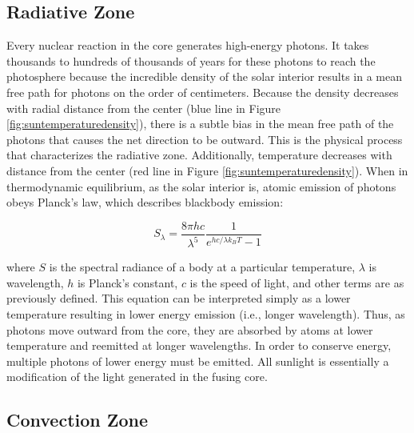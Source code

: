 \subsection{Radiative Zone}
Every nuclear reaction in the core generates high-energy photons. It takes thousands to hundreds of thousands of years for these photons to reach the photosphere because the incredible density of the solar interior results in a mean free path for photons on the order of centimeters. Because the density decreases with radial distance from the center (blue line in Figure \ref{fig:suntemperaturedensity}), there is a subtle bias in the mean free path of the photons that causes the net direction to be outward. This is the physical process that characterizes the radiative zone. Additionally, temperature decreases with distance from the center (red line in Figure \ref{fig:suntemperaturedensity}). When in thermodynamic equilibrium, as the solar interior is, atomic emission of photons obeys Planck's law, which describes blackbody emission: 

\begin{equation}
    \label{eq:planck}
    S_\lambda = \frac{8\pi hc}{\lambda^5}\frac{1}{e^{hc/\lambda k_BT} - 1}
\end{equation}

\noindent where $S$ is the spectral radiance of a body at a particular temperature, $\lambda$ is wavelength, $h$ is Planck's constant, $c$ is the speed of light, and other terms are as previously defined. This equation can be interpreted simply as a lower temperature resulting in lower energy emission (i.e., longer wavelength). Thus, as photons move outward from the core, they are absorbed by atoms at lower temperature and reemitted at longer wavelengths. In order to conserve energy, multiple photons of lower energy must be emitted. All sunlight is essentially a modification of the light generated in the fusing core. 

\subsection{Convection Zone}

